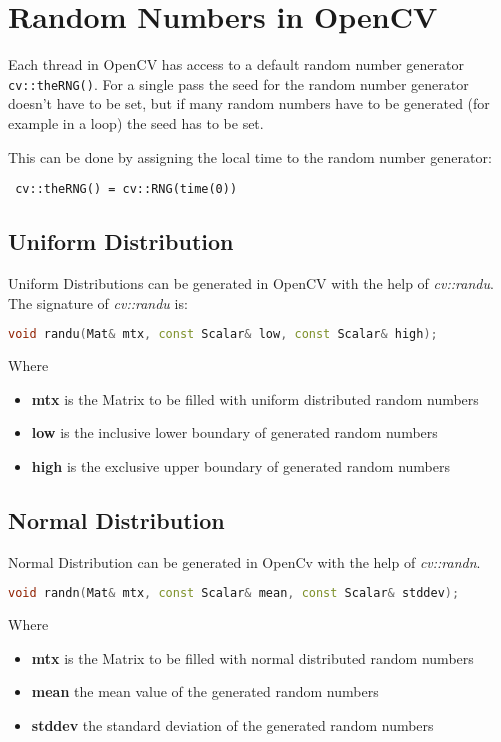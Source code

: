 \section{Random Numbers in OpenCV}
Each thread in OpenCV has access to a default random number generator \lstinline|cv::theRNG()|. For a single pass the seed for the random number generator doesn't have to be set, but if many random numbers have to be generated (for example in a loop) the seed has to be set.

This can be done by assigning the local time to the random number generator:

\begin{lstlisting}
 cv::theRNG() = cv::RNG(time(0))
\end{lstlisting}

\subsection{Uniform Distribution}
Uniform Distributions can be generated in OpenCV with the help of \textit{cv::randu}. The signature of \textit{cv::randu} is:
\begin{lstlisting}[language=C++]
void randu(Mat& mtx, const Scalar& low, const Scalar& high);
\end{lstlisting}
Where
\begin{itemize}
 \item \textbf{mtx} is the Matrix to be filled with uniform distributed random numbers
 \item \textbf{low} is the inclusive lower boundary of generated random numbers
 \item \textbf{high} is the exclusive upper boundary of generated random numbers
\end{itemize}


\subsection{Normal Distribution}
Normal Distribution can be generated in OpenCv with the help of \textit{cv::randn}.
\begin{lstlisting}[language=C++]
void randn(Mat& mtx, const Scalar& mean, const Scalar& stddev);
\end{lstlisting}
Where
\begin{itemize}
 \item \textbf{mtx} is the Matrix to be filled with normal distributed random numbers
 \item \textbf{mean} the mean value of the generated random numbers
 \item \textbf{stddev} the standard deviation of the generated random numbers
\end{itemize}


